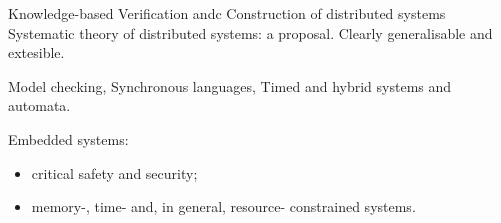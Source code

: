 Knowledge-based Verification andc Construction of distributed systems
Systematic theory of distributed systems: a proposal.
Clearly generalisable and extesible.

Model checking, Synchronous languages, Timed and hybrid systems and automata.

Embedded systems: 
\begin{itemize}
	\item critical safety and security;
	\item memory-, time- and, in general, resource- constrained systems.
\end{itemize}





